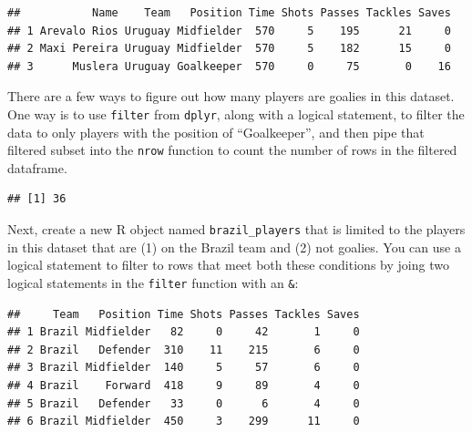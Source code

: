 \documentclass[]{book}
\makeatletter
\newenvironment{Shaded}{\begin{snugshade}}{\end{snugshade}}
\newcommand{\KeywordTok}[1]{\textcolor[rgb]{0.13,0.29,0.53}{\textbf{#1}}}
\newcommand{\StringTok}[1]{\textcolor[rgb]{0.31,0.60,0.02}{#1}}
\newcommand{\OperatorTok}[1]{\textcolor[rgb]{0.81,0.36,0.00}{\textbf{#1}}}
\newcommand{\NormalTok}[1]{#1}
\newenvironment{kframe}{%
\medskip{}
\setlength{\fboxsep}{.8em}
 \def\at@end@of@kframe{}%
 \ifinner\ifhmode%
  \def\at@end@of@kframe{\end{minipage}}%
  \begin{minipage}{\columnwidth}%
 \fi\fi%
 \def\FrameCommand##1{\hskip\@totalleftmargin \hskip-\fboxsep
 \colorbox{shadecolor}{##1}\hskip-\fboxsep
     \hskip-\linewidth \hskip-\@totalleftmargin \hskip\columnwidth}%
 \MakeFramed {\advance\hsize-\width
   \@totalleftmargin\z@ \linewidth\hsize
   \@setminipage}}%
 {\par\unskip\endMakeFramed%
 \at@end@of@kframe}
\renewenvironment{Shaded}{\begin{kframe}}{\end{kframe}}
\theoremstyle{definition}
\theoremstyle{definition}
\theoremstyle{definition}
\theoremstyle{remark}
\makeatother
\begin{document}
\begin{verbatim}
##           Name    Team   Position Time Shots Passes Tackles Saves
## 1 Arevalo Rios Uruguay Midfielder  570     5    195      21     0
## 2 Maxi Pereira Uruguay Midfielder  570     5    182      15     0
## 3      Muslera Uruguay Goalkeeper  570     0     75       0    16
\end{verbatim}

There are a few ways to figure out how many players are goalies in this
dataset. One way is to use \texttt{filter} from \texttt{dplyr}, along
with a logical statement, to filter the data to only players with the
position of ``Goalkeeper'', and then pipe that filtered subset into the
\texttt{nrow} function to count the number of rows in the filtered
dataframe.

\begin{Shaded}
\end{Shaded}

\begin{verbatim}
## [1] 36
\end{verbatim}

Next, create a new R object named \texttt{brazil\_players} that is
limited to the players in this dataset that are (1) on the Brazil team
and (2) not goalies. You can use a logical statement to filter to rows
that meet both these conditions by joing two logical statements in the
\texttt{filter} function with an \texttt{\&}:

\begin{Shaded}
\end{Shaded}

\begin{verbatim}
##     Team   Position Time Shots Passes Tackles Saves
## 1 Brazil Midfielder   82     0     42       1     0
## 2 Brazil   Defender  310    11    215       6     0
## 3 Brazil Midfielder  140     5     57       6     0
## 4 Brazil    Forward  418     9     89       4     0
## 5 Brazil   Defender   33     0      6       4     0
## 6 Brazil Midfielder  450     3    299      11     0
\end{verbatim}
\end{document}
